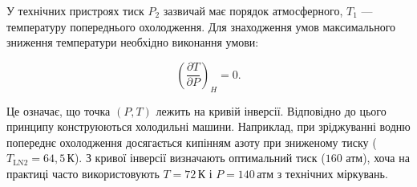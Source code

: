 У технічних пристроях тиск $P_2$ зазвичай має порядок атмосферного, $T_1$ --- температуру попереднього
охолодження. Для знаходження умов максимального зниження температури необхідно виконання умови:

\begin{equation}
\left(\frac{\partial T}{\partial P}\right)_H = 0.
\label{eq:99.6}
\end{equation}

Це означає, що точка $(P,T)$ лежить на кривій інверсії. Відповідно до цього принципу конструюються
холодильні машини. Наприклад, при зріджуванні водню попереднє охолодження досягається кипінням азоту
при зниженому тиску ($T_{\text{LN2}} = 64,5\,\text{К}$). З кривої інверсії визначають оптимальний тиск
($160$ атм), хоча на практиці часто використовують $T = 72\,\text{К}$ і $P = 140\,\text{атм}$ з
технічних міркувань.

